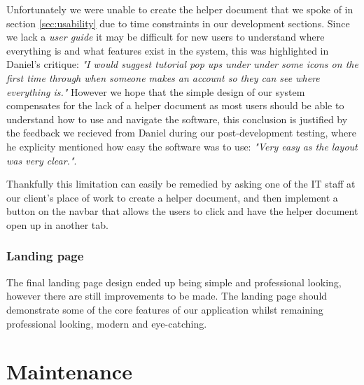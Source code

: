 Unfortunately we were unable to create the helper document that we spoke of in section \ref{sec:usability} due to
time constraints in our development sections. Since we lack a \textit{user guide} it may be difficult for new users
to understand where everything is and what features exist in the system, this was highlighted in Daniel's critique:
\textit{"I would suggest tutorial pop ups under
under some icons on the first time through
when someone makes an account so they
can see where everything is."} However we hope that the simple design of our system compensates for the
lack of a helper document as most users should be able to understand how to use and navigate the software, this
conclusion is justified by the feedback we recieved from Daniel during our post-development testing, where he
explicity mentioned how easy the software was to use: \textit{"Very easy as the layout was very clear."}. \\
\vspace{0.2cm}

Thankfully this limitation can easily be remedied by asking one of the IT staff at our client's place of work to create
a helper document, and then implement a button on the navbar that allows the users to click and have the helper
document open up in another tab.

\subsubsection{Landing page}

The final landing page design ended up being simple and professional looking, however there are still improvements
to be made. The landing page should demonstrate some of the core features of our application whilst remaining
professional looking, modern and eye-catching.

\section{Maintenance}
